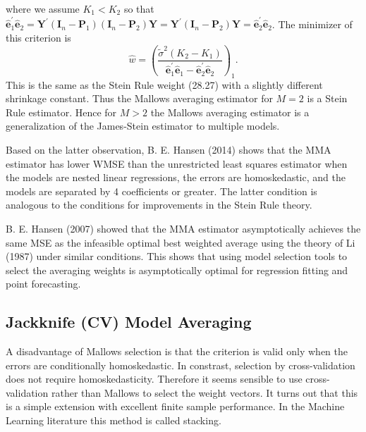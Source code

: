 \documentclass[10pt]{article}
\begin{document}
where we assume $K_{1}<K_{2}$ so that $\widehat{\boldsymbol{e}}_{1}^{\prime} \widehat{\boldsymbol{e}}_{2}=\boldsymbol{Y}^{\prime}\left(\boldsymbol{I}_{n}-\boldsymbol{P}_{1}\right)\left(\boldsymbol{I}_{n}-\boldsymbol{P}_{2}\right) \boldsymbol{Y}=\boldsymbol{Y}^{\prime}\left(\boldsymbol{I}_{n}-\boldsymbol{P}_{2}\right) \boldsymbol{Y}=\widehat{\boldsymbol{e}}_{2}^{\prime} \widehat{\boldsymbol{e}}_{2}$. The minimizer of this criterion is
$$
\widehat{w}=\left(\frac{\widetilde{\sigma}^{2}\left(K_{2}-K_{1}\right)}{\widehat{\boldsymbol{e}}_{1}^{\prime} \widehat{\boldsymbol{e}}_{1}-\widehat{\boldsymbol{e}}_{2}^{\prime} \widehat{\boldsymbol{e}}_{2}}\right)_{1} .
$$
This is the same as the Stein Rule weight (28.27) with a slightly different shrinkage constant. Thus the Mallows averaging estimator for $M=2$ is a Stein Rule estimator. Hence for $M>2$ the Mallows averaging estimator is a generalization of the James-Stein estimator to multiple models.

Based on the latter observation, B. E. Hansen (2014) shows that the MMA estimator has lower WMSE than the unrestricted least squares estimator when the models are nested linear regressions, the errors are homoskedastic, and the models are separated by 4 coefficients or greater. The latter condition is analogous to the conditions for improvements in the Stein Rule theory.

B. E. Hansen (2007) showed that the MMA estimator asymptotically achieves the same MSE as the infeasible optimal best weighted average using the theory of Li (1987) under similar conditions. This shows that using model selection tools to select the averaging weights is asymptotically optimal for regression fitting and point forecasting.

\subsection{Jackknife (CV) Model Averaging}
A disadvantage of Mallows selection is that the criterion is valid only when the errors are conditionally homoskedastic. In constrast, selection by cross-validation does not require homoskedasticity. Therefore it seems sensible to use cross-validation rather than Mallows to select the weight vectors. It turns out that this is a simple extension with excellent finite sample performance. In the Machine Learning literature this method is called stacking.
\end{document}
